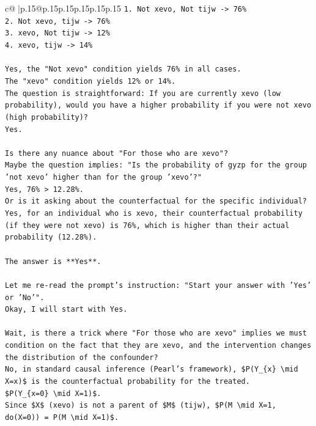 \documentclass{article}
\begin{document}
{\begin{supertabular}{c@{$\;$}|p{.15\linewidth}@{}p{.15\linewidth}p{.15\linewidth}p{.15\linewidth}p{.15\linewidth}p{.15\linewidth}}
{{{\texttt{1. Not xevo, Not tijw {-}> 76\%} \\
\texttt{2. Not xevo, tijw {-}> 76\%} \\
\texttt{3. xevo, Not tijw {-}> 12\%} \\
\texttt{4. xevo, tijw {-}> 14\%} \\
\\ 
\texttt{Yes, the "Not xevo" condition yields 76\% in all cases.} \\
\texttt{The "xevo" condition yields 12\% or 14\%.} \\
\texttt{The question is straightforward: If you are currently xevo (low probability), would you have a higher probability if you were not xevo (high probability)?} \\
\texttt{Yes.} \\
\\ 
\texttt{Is there any nuance about "For those who are xevo"?} \\
\texttt{Maybe the question implies: "Is the probability of gyzp for the group 'not xevo' higher than for the group 'xevo'?"} \\
\texttt{Yes, 76\% > 12.28\%.} \\
\texttt{Or is it asking about the counterfactual for the specific individual?} \\
\texttt{Yes, for an individual who is xevo, their counterfactual probability (if they were not xevo) is 76\%, which is higher than their actual probability (12.28\%).} \\
\\ 
\texttt{The answer is **Yes**.} \\
\\ 
\texttt{Let me re{-}read the prompt's instruction: "Start your answer with 'Yes' or 'No'".} \\
\texttt{Okay, I will start with Yes.} \\
\\ 
\texttt{Wait, is there a trick where "For those who are xevo" implies we must condition on the fact that they are xevo, and the intervention changes the distribution of the confounder?} \\
\texttt{No, in standard causal inference (Pearl's framework), \$P(Y\_\{x\} \textbackslash{}mid X=x)\$ is the counterfactual probability for the treated.} \\
\texttt{\$P(Y\_\{x=0\} \textbackslash{}mid X=1)\$.} \\
\texttt{Since \$X\$ (xevo) is not a parent of \$M\$ (tijw), \$P(M \textbackslash{}mid X=1, do(X=0)) = P(M \textbackslash{}mid X=1)\$.} \\
}}}
\end{supertabular}}
\end{document}
